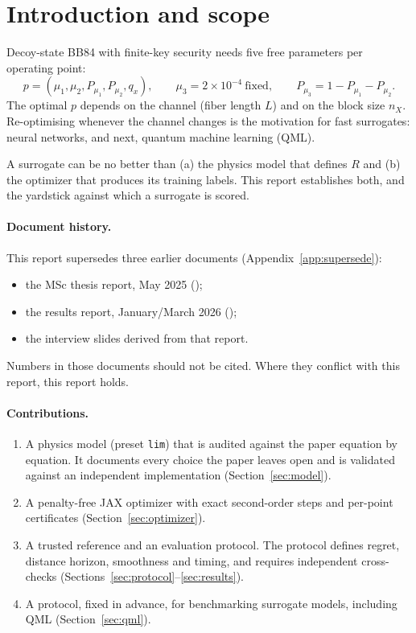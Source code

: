 \documentclass[11pt,a4paper]{article}
\newcommand{\plim}{\texttt{lim}}
\begin{document}
\tableofcontents
\newpage

\section{Introduction and scope}
Decoy-state BB84 with finite-key security needs five free parameters per operating point:
\[
  p = (\mu_1,\mu_2,P_{\mu_1},P_{\mu_2},q_x),\qquad \mu_3 = 2\times10^{-4}\ \text{fixed},\qquad P_{\mu_3}=1-P_{\mu_1}-P_{\mu_2}.
\]
The optimal $p$ depends on the channel (fiber length $L$) and on the block size $n_X$. Re-optimising whenever the
channel changes is the motivation for fast surrogates: neural networks, and next, quantum machine learning (QML).

A surrogate can be no better than (a) the physics model that defines $R$ and (b) the optimizer that produces its
training labels. This report establishes both, and the yardstick against which a surrogate is scored.

\paragraph{Document history.} This report supersedes three earlier documents (Appendix~\ref{app:supersede}):
\begin{itemize}
\item the MSc thesis report, May 2025 ();
\item the results report, January/March 2026 ();
\item the interview slides derived from that report.
\end{itemize}
Numbers in those documents should not be cited. Where they conflict with this report, this report holds.

\paragraph{Contributions.}
\begin{enumerate}
\item A physics model (preset \plim) that is audited against the paper equation by equation. It documents every
  choice the paper leaves open and is validated against an independent implementation (Section~\ref{sec:model}).
\item A penalty-free JAX optimizer with exact second-order steps and per-point certificates
  (Section~\ref{sec:optimizer}).
\item A trusted reference and an evaluation protocol. The protocol defines regret, distance horizon, smoothness
  and timing, and requires independent cross-checks (Sections~\ref{sec:protocol}--\ref{sec:results}).
\item A protocol, fixed in advance, for benchmarking surrogate models, including QML (Section~\ref{sec:qml}).
\end{enumerate}
\end{document}
